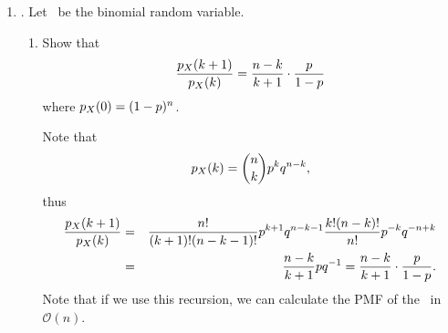 \begin{enumerate}
	\item {}.
	Let \X\ be the binomial random variable.
	\begin{enumerate}
		\item Show that
		\[
			\frac{p_{X}(k+1)}{p_{X}(k)}
			= \frac{n-k}{k+1} \cdot \frac{p}{1-p}
		\]
		where $p_{X}(0) = (1-p)^n$.
		\ifdefined\sol
		\begin{solution}
			Note that
			\[
				p_{X}(k) = {{n} \choose {k}} p^k q^{n-k},
			\]
			thus
			\begin{eqnarray*}
				\frac{p_{X}(k+1)}{p_{X}(k)}
				&=& \frac{n!}{(k+1)!(n-k-1)!} p^{k+1} q^{n-k-1}
				\frac{k!(n-k)!}{n!} p^{-k} q^{-n+k}
				\\&=&
				\frac{n-k}{k+1} p q^{-1}
				= \frac{n-k}{k+1} \cdot \frac{p}{1-p}.
			\end{eqnarray*}
			Note that if we use this recursion,
			we can calculate the PMF of the \binomrv\ in $\mathcal{O}(n)$.
		\end{solution}
		\fi


\end{enumerate}
\end{enumerate}
